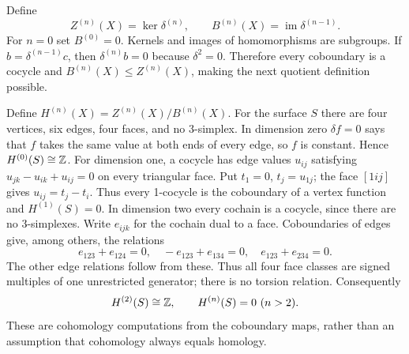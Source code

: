 Define
\[
Z^{(n)}(X)=\ker\delta^{(n)},\qquad
B^{(n)}(X)=\operatorname{im}\delta^{(n-1)}.
\]
For $n=0$ set $B^{(0)}=0$. Kernels and images of homomorphisms are subgroups. If $b=\delta^{(n-1)}c$, then $\delta^{(n)}b=0$ because $\delta^2=0$. Therefore every coboundary is a cocycle and $B^{(n)}(X)\le Z^{(n)}(X)$, making the next quotient definition possible.

Define $H^{(n)}(X)=Z^{(n)}(X)/B^{(n)}(X)$.
For the surface $S$ there are four vertices, six edges, four faces, and no 3-simplex.
In dimension zero $\delta f=0$ says that $f$ takes the same value at both ends of every edge, so $f$ is constant. Hence $H^{(0)}(S)\cong\mathbb{Z}$.
For dimension one, a cocycle has edge values $u_{ij}$ satisfying $u_{jk}-u_{ik}+u_{ij}=0$ on every triangular face. Put $t_1=0$, $t_j=u_{1j}$; the face $[1ij]$ gives $u_{ij}=t_j-t_i$. Thus every 1-cocycle is the coboundary of a vertex function and $H^{(1)}(S)=0$.
In dimension two every cochain is a cocycle, since there are no 3-simplexes. Write $e_{ijk}$ for the cochain dual to a face. Coboundaries of edges give, among others, the relations
\[
e_{123}+e_{124}=0,\quad -e_{123}+e_{134}=0,
\quad e_{123}+e_{234}=0.
\]
The other edge relations follow from these. Thus all four face classes are signed multiples of one unrestricted generator; there is no torsion relation. Consequently
\[
H^{(2)}(S)\cong\mathbb{Z},\qquad H^{(n)}(S)=0\ (n>2).
\]
These are cohomology computations from the coboundary maps, rather than an assumption that cohomology always equals homology.
